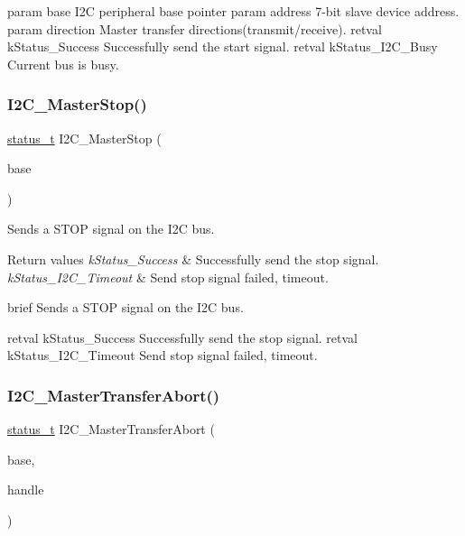 param base I2C peripheral base pointer param address 7-\/bit slave device address. param direction Master transfer directions(transmit/receive). retval k\+Status\+\_\+\+Success Successfully send the start signal. retval k\+Status\+\_\+\+I2\+C\+\_\+\+Busy Current bus is busy. \mbox{\label{group__i2c__driver_gaf46a8cc094fc18c6cadea8de71448723}} 
\subsubsection{\texorpdfstring{I2C\_MasterStop()}{I2C\_MasterStop()}}
{\footnotesize\ttfamily \mbox{\hyperlink{group__ksdk__common_gaaabdaf7ee58ca7269bd4bf24efcde092}{status\+\_\+t}} I2\+C\+\_\+\+Master\+Stop (\begin{DoxyParamCaption}\item[{\mbox{\hyperlink{struct_i2_c___type}{I2\+C\+\_\+\+Type}} $\ast$}]{base }\end{DoxyParamCaption})}



Sends a S\+T\+OP signal on the I2C bus. 


\begin{DoxyRetVals}{Return values}
{\em k\+Status\+\_\+\+Success} & Successfully send the stop signal. \\
\hline
{\em k\+Status\+\_\+\+I2\+C\+\_\+\+Timeout} & Send stop signal failed, timeout.\\
\hline
\end{DoxyRetVals}
brief Sends a S\+T\+OP signal on the I2C bus.

retval k\+Status\+\_\+\+Success Successfully send the stop signal. retval k\+Status\+\_\+\+I2\+C\+\_\+\+Timeout Send stop signal failed, timeout. \mbox{\label{group__i2c__driver_gabb386e53b2bc64e29b2915bdfac36800}} 
\subsubsection{\texorpdfstring{I2C\_MasterTransferAbort()}{I2C\_MasterTransferAbort()}}
{\footnotesize\ttfamily \mbox{\hyperlink{group__ksdk__common_gaaabdaf7ee58ca7269bd4bf24efcde092}{status\+\_\+t}} I2\+C\+\_\+\+Master\+Transfer\+Abort (\begin{DoxyParamCaption}\item[{\mbox{\hyperlink{struct_i2_c___type}{I2\+C\+\_\+\+Type}} $\ast$}]{base,  }\item[{\mbox{\hyperlink{group__i2c__driver_ga2fd51f58b8cfd309be985bce4b817fdc}{i2c\+\_\+master\+\_\+handle\+\_\+t}} $\ast$}]{handle }\end{DoxyParamCaption})}



